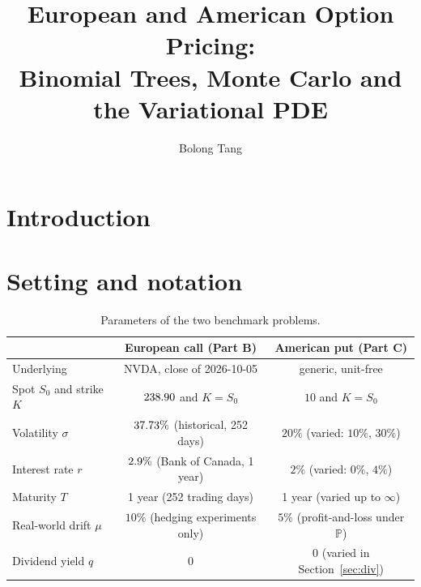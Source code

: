 \documentclass[12pt]{amsart}
\title[Option pricing: trees, Monte Carlo, PDE]{European and American Option Pricing:\\ Binomial Trees, Monte Carlo and the Variational PDE}
\author{Bolong Tang}
\begin{document}
\begin{abstract}

\end{abstract}

\maketitle

\section{Introduction}






\section{Setting and notation}\label{sec:setting}




\begin{table}[h!]
\centering
\begin{tabular}{lcc}
\toprule
 & European call (Part B) & American put (Part C)\\
\midrule
Underlying & NVDA, close of 2026-10-05 & generic, unit-free\\
Spot $S_0$ and strike $K$ & $238.90$ and $K=S_0$ & $10$ and $K=S_0$\\
Volatility $\sigma$ & $37.73\%$ (historical, 252 days) & $20\%$ (varied: $10\%$, $30\%$)\\
Interest rate $r$ & $2.9\%$ (Bank of Canada, 1 year) & $2\%$ (varied: $0\%$, $4\%$)\\
Maturity $T$ & 1 year (252 trading days) & 1 year (varied up to $\infty$)\\
Real-world drift $\mu$ & $10\%$ (hedging experiments only) & $5\%$ (profit-and-loss under $\mathbb P$)\\
Dividend yield $q$ & $0$ & $0$ (varied in Section~\ref{sec:div})\\
\bottomrule
\end{tabular}
\caption{Parameters of the two benchmark problems.\label{tbl:params}}
\end{table}

\end{document}
